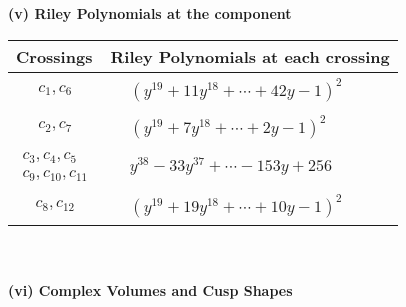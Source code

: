 \documentclass[1p]{elsarticle_modified}
\theoremstyle{definition}
\begin{document}
\newpage\renewcommand{\arraystretch}{1}
\flushleft \textbf{(v) Riley Polynomials at the component}\newline \\
\begin{tabular}{m{50pt}|m{274pt}}
Crossings & \hspace{64pt}Riley Polynomials at each crossing \\
\hline $$\begin{aligned}c_{1},c_{6}\end{aligned}$$&$\begin{aligned}
&(y^{19}+11 y^{18}+\cdots+42 y-1)^{2}
\end{aligned}$\\
\hline $$\begin{aligned}c_{2},c_{7}\end{aligned}$$&$\begin{aligned}
&(y^{19}+7 y^{18}+\cdots+2 y-1)^{2}
\end{aligned}$\\
\hline $$\begin{aligned}c_{3},c_{4},c_{5}\\c_{9},c_{10},c_{11}\end{aligned}$$&$\begin{aligned}
&y^{38}-33 y^{37}+\cdots-153 y+256
\end{aligned}$\\
\hline $$\begin{aligned}c_{8},c_{12}\end{aligned}$$&$\begin{aligned}
&(y^{19}+19 y^{18}+\cdots+10 y-1)^{2}
\end{aligned}$\\
\hline
\end{tabular}\\~\\
\newpage\flushleft \textbf{(vi) Complex Volumes and Cusp Shapes}
\end{document}
